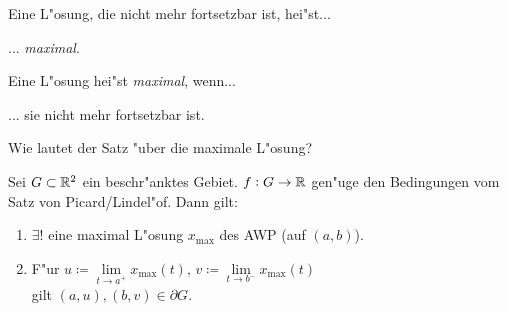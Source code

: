 \documentclass[9pt]{article}
\newcommand{\R}[1]{%
	\ifthenelse{\equal{#1}{}}
	{\mathbb{R}}
	{\mathbb{R}^{#1}}}%
\newenvironment{field}{}{\newpage}
\newif\ifnote
\newenvironment{note}{\notetrue}{\notefalse}
\newcommand{\localtag}{}
\newcommand{\globaltag}{}
\newcommand{\uuid}{}
\newcommand{\tags}[1]{
    \ifnote 
        \renewcommand{\localtag}{#1}
    \else
        \renewcommand{\globaltag}{#1}
    \fi 
    }
\newcommand{\xplain}[1]{\renewcommand{\uuid}{#1}}
\begin{document}
\begin{note}
	\xplain{48930130-59f6-47b4-9040-fd8445dad4ac}
	\tags{definition, fortsetzung,, 3.5.3, 3.5.4}
	
	\begin{field}  %
		Eine L"osung, die nicht mehr fortsetzbar ist, hei"st...
	\end{field}
	
	\begin{field}  %
		... \textit{maximal}.
	\end{field}
		
	\begin{field}  %
		Eine L"osung hei"st \textit{maximal}, wenn...
	\end{field}
	
	\begin{field}  %
		... sie nicht mehr fortsetzbar ist.
	\end{field}
		
	\begin{field}  %
		Wie lautet der Satz "uber die maximale L"osung?
	\end{field}
	
	\begin{field}  %
		Sei $G \subset \R{2}$ ein beschr"anktes Gebiet. $f: G \rightarrow \R{}$ gen"uge den Bedingungen vom Satz von Picard/Lindel"of. Dann gilt:
		\begin{enumerate}
			\item $\exists!$ eine maximal L"osung $x_{\text{max}}$ des AWP (auf $(a,b)$).
			\item F"ur $u \coloneqq \lim\limits_{t\rightarrow a^+}x_{\text{max}}(t)$,
			$v\coloneqq \lim\limits_{t\rightarrow b^-}x_{\text{max}}(t)$ \\
			gilt $(a,u), (b,v) \in \partial G$.
		\end{enumerate}
	\end{field}
\end{note}
\end{document}
